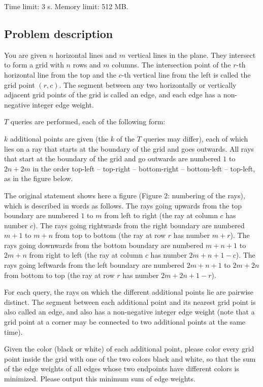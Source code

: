 \documentclass[11pt]{article}
\begin{document}
Time limit: 3 s.
Memory limit: 512 MB.

\subsection*{Problem description}

You are given $n$ horizontal lines and $m$ vertical lines in the plane.
They intersect to form a grid with $n$ rows and $m$ columns.
The intersection point of the $r$-th horizontal line from the top and the
$c$-th vertical line from the left is called the grid point $(r, c)$.
The segment between any two horizontally or vertically adjacent grid
points of the grid is called an edge, and each edge has a non-negative
integer edge weight.

$T$ queries are performed, each of the following form:

$k$ additional points are given (the $k$ of the $T$ queries may differ),
each of which lies on a ray that starts at the boundary of the grid and
goes outwards.
All rays that start at the boundary of the grid and go outwards are
numbered $1$ to $2n + 2m$ in the order
top-left -- top-right -- bottom-right -- bottom-left -- top-left,
as in the figure below.

The original statement shows here a figure (Figure 2: numbering of the
rays), which is described in words as follows.
The rays going upwards from the top boundary are numbered $1$ to $m$ from
left to right (the ray at column $c$ has number $c$).
The rays going rightwards from the right boundary are numbered $m + 1$ to
$m + n$ from top to bottom (the ray at row $r$ has number $m + r$).
The rays going downwards from the bottom boundary are numbered $m + n + 1$
to $2m + n$ from right to left (the ray at column $c$ has number
$2m + n + 1 - c$).
The rays going leftwards from the left boundary are numbered $2m + n + 1$
to $2m + 2n$ from bottom to top (the ray at row $r$ has number
$2m + 2n + 1 - r$).

For each query, the rays on which the different additional points lie are
pairwise distinct.
The segment between each additional point and its nearest grid point is
also called an edge, and also has a non-negative integer edge weight
(note that a grid point at a corner may be connected to two additional
points at the same time).

Given the color (black or white) of each additional point, please color
every grid point inside the grid with one of the two colors black and
white, so that the sum of the edge weights of all edges whose two
endpoints have different colors is minimized.
Please output this minimum sum of edge weights.
\end{document}
